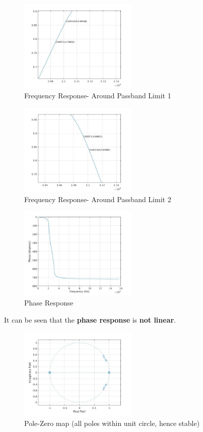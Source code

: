 \documentclass[12pt]{article}
\begin{document}
\begin{figure}[h!]
	\centering	
	\includegraphics[width = 0.5\textwidth]{1pb1.jpg}
    \caption{Frequency Response- Around Passband Limit 1}
\end{figure}
\begin{figure}[h!]
	\centering	
	\includegraphics[width = 0.5\textwidth]{1pb2.jpg}
    \caption{Frequency Response- Around Passband Limit 2}
\end{figure}
\begin{figure}[h!]
	\centering	
	\includegraphics[width = 0.5\textwidth]{1ph.jpg}
    \caption{Phase Response}
\end{figure}
\newpage
It can be seen that the \textbf{phase response} is \textbf{not linear}.
\begin{figure}[h!]
	\centering	
	\includegraphics[width = 0.5\textwidth]{1pz.jpg}
    \caption{Pole-Zero map (all poles within unit circle, hence stable)}
\end{figure}
\newpage
\
\newpage
\end{document}
